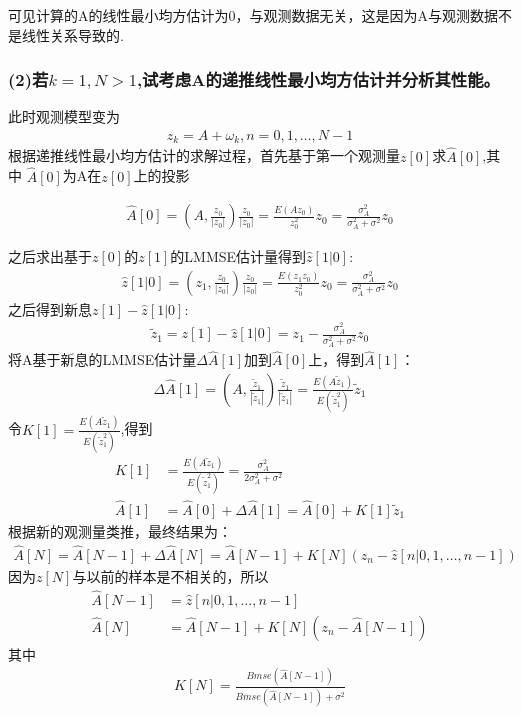 \documentclass[fontset=windows]{article}
\numberwithin{figure}{section}
\begin{document}
可见计算的A的线性最小均方估计为0，与观测数据无关，这是因为A与观测数据不是线性关系导致的.

\subsubsection*{(2)若\(k=1,N>1\),试考虑A的递推线性最小均方估计并分析其性能。}

此时观测模型变为
\begin{align*}
	z_k=A+\omega_k,n=0,1,\dots,N-1
\end{align*}
根据递推线性最小均方估计的求解过程，首先基于第一个观测量\(z[0]\)求\(\hat{A}[0]\),其中
\(\hat{A}[0]\)为A在\(z[0]\)上的投影

\begin{align*}
	\hat{A}[0]=\left( A,\frac{z_0}{|z_0|}\right)\frac{z_0}{|z_0|}=\frac{E(Az_0)}{z_0^2}z_0
	=\frac{\sigma_A^2}{\sigma_A^2+\sigma^2}z_0
\end{align*}

之后求出基于\(z[0]\)的\(z[1]\)的LMMSE估计量得到\(\hat{z}[1|0]\):
\begin{align*}
	\hat{z}[1|0]=\left( z_1,\frac{z_0}{|z_0|}\right)\frac{z_0}{|z_0|}=\frac{E(z_1 z_0)}{z_0^2}z_0
	=\frac{\sigma_A^2}{\sigma_A^2+\sigma^2}z_0
\end{align*}
之后得到新息\(z[1]-\hat{z}[1|0]\):
\begin{align*}
	\widetilde{z}_1=z[1]-\hat{z}[1|0]=z_1-\frac{\sigma_A^2}{\sigma_A^2+\sigma^2}z_0
\end{align*}
将A基于新息的LMMSE估计量\(\Delta\hat{A}[1]\)加到\(\hat{A}[0]\)上，得到\(\hat{A}[1]\)：
\begin{align*}
	\Delta\hat{A}[1]=\left(A,\frac{\widetilde{z}_1}{|\widetilde{z}_1|}\right)
	\frac{\widetilde{z}_1}{|\widetilde{z}_1|}=\frac{E(A\widetilde{z}_1)}{E(\widetilde{z}_1^2)}\widetilde{z}_1
\end{align*}
令\(K[1]=\frac{E(A\widetilde{z}_1)}{E(\widetilde{z}_1^2)}\),得到
\begin{align*}
	K[1]       & =\frac{E(A\widetilde{z}_1)}{E(\widetilde{z}_1^2)}=\frac{\sigma_A^2}{2\sigma_A^2+\sigma^2} \\
	\hat{A}[1] & =\hat{A}[0]+\Delta\hat{A}[1]=\hat{A}[0]+K[1]\widetilde{z}_1
\end{align*}
根据新的观测量类推，最终结果为：
\begin{align*}
	\hat{A}[N]=\hat{A}[N-1]+\Delta\hat{A}[N]=\hat{A}[N-1]+K[N](z_n-\hat{z}[n|0,1,\dots,n-1])
\end{align*}
因为\(z[N]\)与以前的样本是不相关的，所以
\begin{align*}
	\hat{A}[N-1] & =\hat{z}[n|0,1,\dots,n-1]            \\
	\hat{A}[N]   & =\hat{A}[N-1]+K[N](z_n-\hat{A}[N-1])
\end{align*}
其中
\begin{align*}
	K[N]=\frac{Bmse(\hat{A}[N-1])}{Bmse(\hat{A}[N-1])+\sigma^2}
\end{align*}
\end{document}
